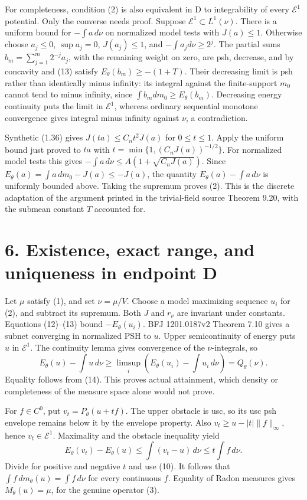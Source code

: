 \documentclass[11pt]{article}
\begin{document}
For completeness, condition (2) is also equivalent in D to integrability of every \(\mathcal E^1\) potential. Only the converse needs proof. Suppose \(\mathcal E^1\subset L^1(\nu)\). There is a uniform bound for \(-\int a\,d\nu\) on normalized model tests with \(J(a)\leq1\). Otherwise choose \(a_j\leq0\), \(\sup a_j=0\), \(J(a_j)\leq1\), and \(-\int a_jd\nu\geq2^j\). The partial sums \(b_m=\sum_{j=1}^m2^{-j}a_j\), with the remaining weight on zero, are psh, decrease, and by concavity and (13) satisfy \(E_\theta(b_m)\geq-(1+T)\). Their decreasing limit is psh rather than identically minus infinity: its integral against the finite-support \(m_0\) cannot tend to minus infinity, since \(\int b_mdm_0\geq E_\theta(b_m)\). Decreasing energy continuity puts the limit in \(\mathcal E^1\), whereas ordinary sequential monotone convergence gives integral minus infinity against \(\nu\), a contradiction.

Synthetic (1.36) gives \(J(ta)\leq C_nt^2J(a)\) for \(0\leq t\leq1\). Apply the uniform bound just proved to \(ta\) with \(t=\min\{1,(C_nJ(a))^{-1/2}\}\). For normalized model tests this gives \(-\int a\,d\nu\leq A(1+\sqrt{C_nJ(a)})\). Since \(E_\theta(a)=\int a\,dm_0-J(a)\leq-J(a)\), the quantity \(E_\theta(a)-\int a\,d\nu\) is uniformly bounded above. Taking the supremum proves (2). This is the discrete adaptation of the argument printed in the trivial-field source Theorem 9.20, with the submean constant \(T\) accounted for.

\section*{6. Existence, exact range, and uniqueness in endpoint D}

Let \(\mu\) satisfy (1), and set \(\nu=\mu/V\). Choose a model maximizing sequence \(u_i\) for (2), and subtract its supremum. Both \(J\) and \(r_\nu\) are invariant under constants. Equations (12)--(13) bound \(-E_\theta(u_i)\). BFJ 1201.0187v2 Theorem 7.10 gives a subnet converging in normalized PSH to \(u\). Upper semicontinuity of energy puts \(u\) in \(\mathcal E^1\). The continuity lemma gives convergence of the \(\nu\)-integrals, so
\[
 E_\theta(u)-\int u\,d\nu
 \geq\limsup_i\left(E_\theta(u_i)-\int u_i\,d\nu\right)
 =Q_\theta(\nu).
 \tag{16}
\]
Equality follows from (14). This proves actual attainment, which density or completeness of the measure space alone would not prove.

For \(f\in C^0\), put \(v_t=P_\theta(u+tf)\). The upper obstacle is usc, so its usc psh envelope remains below it by the envelope property. Also \(v_t\geq u-|t|\|f\|_\infty\), hence \(v_t\in\mathcal E^1\). Maximality and the obstacle inequality yield
\[
 E_\theta(v_t)-E_\theta(u)
 \leq\int(v_t-u)\,d\nu\leq t\int f\,d\nu.
 \tag{17}
\]
Divide for positive and negative \(t\) and use (10). It follows that \(\int f\,dm_\theta(u)=\int f\,d\nu\) for every continuous \(f\). Equality of Radon measures gives \(M_\theta(u)=\mu\), for the genuine operator (3).
\end{document}
